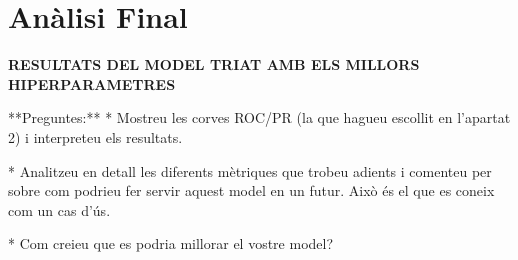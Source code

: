 \documentclass[9pt,a4paper,twoside]{tau-class/tau}
\begin{document}
\section{Anàlisi Final}
\textbf{RESULTATS DEL MODEL TRIAT AMB ELS MILLORS HIPERPARAMETRES}

**Preguntes:**
* Mostreu les corves ROC/PR (la que hagueu escollit en l'apartat 2) i interpreteu els resultats.

* Analitzeu en detall les diferents mètriques que trobeu adients i comenteu per sobre com podrieu fer servir aquest model en un futur. Això és el que es coneix com un cas d'ús.

* Com creieu que es podria millorar el vostre model?
\end{document}
